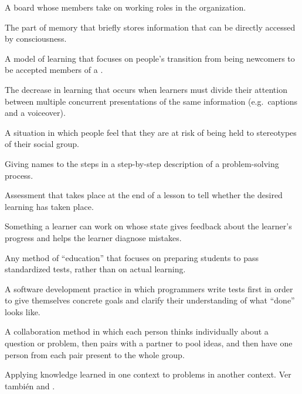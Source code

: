 \begin{description}
 A board whose members take on working roles
in the organization.

 The part of memory that briefly
stores information that can be directly accessed by consciousness.

 A model of learning that focuses
on people's transition from being newcomers to be accepted members of a
.

 The decrease in
learning that occurs when learners must divide their attention between multiple
concurrent presentations of the same information (e.g.\ captions and a
voiceover).

 A situation in which people feel
that they are at risk of being held to stereotypes of their social group.

 Giving names to the steps in a
step-by-step description of a problem-solving process.

 Assessment that takes
place at the end of a lesson to tell whether the desired learning has taken
place.

 Something a learner can work on
whose state gives feedback about the learner's progress and helps the learner
diagnose mistakes.

 Any method of ``education''
that focuses on preparing students to pass standardized tests, rather than on
actual learning.

 A software
development practice in which programmers write tests first in order to give
themselves concrete goals and clarify their understanding of what ``done'' looks
like.

 A collaboration method in which
each person thinks individually about a question or problem, then pairs with a
partner to pool ideas, and then have one person from each pair present to the
whole group.

 Applying knowledge learned
in one context to problems in another context.  Ver también
 and .


\end{description}
